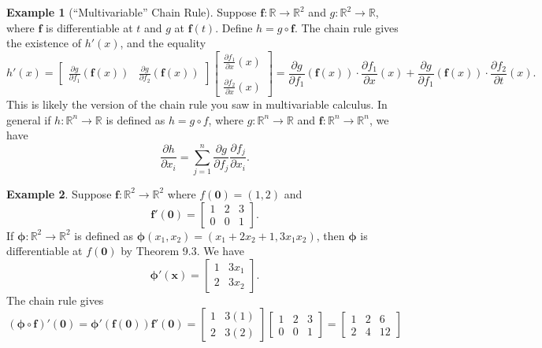 \documentclass{article}
\newcommand{\R}{\mathbb{R}}
\newcommand{\x}{\mathbf{x}}
\newcommand{\f}{\mathbf{f}}
\newcommand{\ze}{\mathbf{0}}
\theoremstyle{definition}
\newtheorem{example}{Example}[section]
\begin{document}
	\begin{example}[``Multivariable'' Chain Rule]
		Suppose $ \f:\R\to\R^2 $ and $ g:\R^2\to\R $, where $ \f $ is differentiable at $ t $ and $ g $ at $ \f(t) $. Define $ h=g\circ\f $. The chain rule gives the existence of $h'(x) $, and the equality
		$$ h'(x) =  \begin{bmatrix}
			\frac{\partial g}{\partial f_1}(\f(x)) & \frac{\partial g}{\partial f_2}(\f(x))
		\end{bmatrix}\begin{bmatrix}
			\frac{\partial f_1}{\partial x}(x)\\\\ \frac{\partial f_2}{\partial x}(x)
		\end{bmatrix} = \frac{\partial g}{\partial f_1}(\f(x))\cdot 	\frac{\partial f_1}{\partial x}(x) + \frac{\partial g}{\partial f_1}(\f(x))\cdot 	\frac{\partial f_2}{\partial t}(x).$$
		This is likely the version of the chain rule you saw in multivariable calculus. In general if $ h:\R^n\to \R $ is defined as $ h=g\circ f $, where $ g:\R^n\to\R $ and $ \f:\R^n\to\R^n $, 
		we have $$ \frac{\partial h}{\partial x_i}= \sum_{j=1}^n\frac{\partial g}{\partial f_j}\frac{\partial f_j}{\partial x_i} .$$
	\end{example}
	\begin{example}
		Suppose $ \f:\R^2\to \R^2 $ where $ f(\ze)=(1,2) $ and $$ \f'(\ze) = \begin{bmatrix}
			1&2&3\\0&0&1
		\end{bmatrix}.$$
		If $ \boldsymbol{\phi}:\R^2\to\R^2 $ is defined as $ \boldsymbol{\phi}(x_1,x_2)= (x_1+2x_2+1,3x_1x_2) $, then $ \boldsymbol{\phi} $ is differentiable at $ f(\ze) $ by Theorem 9.3. We have 
		$$ \boldsymbol{\phi}'(\x) = \begin{bmatrix}
			1 & 3x_1\\2 & 3x_2
		\end{bmatrix}.$$
		The chain rule gives 
		$$ (\boldsymbol{\phi}\circ \mathbf f)'(\ze) = \boldsymbol{\phi}'(\f(\ze))\f'(\ze) = \begin{bmatrix}
			1 & 3(1)\\2 & 3(2)
		\end{bmatrix}\begin{bmatrix}
			1&2&3\\0&0&1
		\end{bmatrix} = \begin{bmatrix}
			1&2&6\\2&4&12
		\end{bmatrix} $$
	\end{example}
\end{document}
